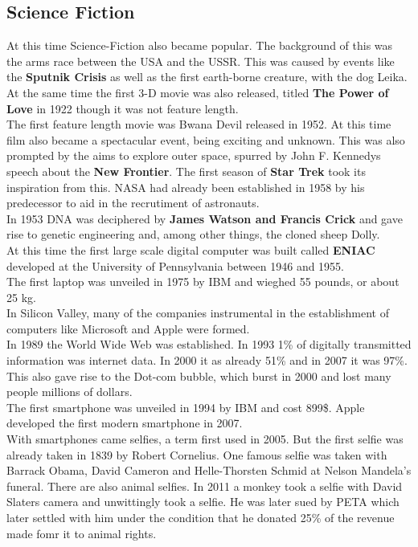 \documentclass{article}
\begin{document}
	\subsection{Science Fiction}
	At this time Science-Fiction also became popular. The background of this was the arms race between the USA and the USSR. This was caused by events like the \textbf{Sputnik Crisis} as well as the first earth-borne creature, with the dog Leika. \\
	At the same time the first 3-D movie was also released, titled \textbf{The Power of Love} in 1922 though it was not feature length. \\
	The first feature length movie was Bwana Devil released in 1952.
	At this time film also became a spectacular event, being exciting and unknown. This was also prompted by the aims to explore outer space, spurred by John F. Kennedys speech about the \textbf{New Frontier}. The first season of \textbf{Star Trek} took its inspiration from this. NASA had already been established in 1958 by his predecessor to aid in the recrutiment of astronauts. \\
	In 1953 DNA was deciphered by \textbf{James Watson and Francis Crick} and gave rise to genetic engineering and, among other things, the cloned sheep Dolly. \\
	At this time the first large scale digital computer was built called \textbf{ENIAC} developed at the University of Pennsylvania between 1946 and 1955. \\
	The first laptop was unveiled in 1975 by IBM and wieghed 55 pounds, or about 25 kg. \\
	In Silicon Valley, many of the companies instrumental in the establishment of computers like Microsoft and Apple were formed. \\
	In 1989 the World Wide Web was established. In 1993 1\% of digitally transmitted information was internet data. In 2000 it as already 51\% and in 2007 it was 97\%. This also gave rise to the Dot-com bubble, which burst in 2000 and lost many people millions of dollars. \\
	The first smartphone was unveiled in 1994 by IBM and cost 899\$. Apple developed the first modern smartphone in 2007. \\
	With smartphones came selfies, a term first used in 2005. But the first selfie was already taken in 1839 by Robert Cornelius. One  famous selfie was taken with Barrack Obama, David Cameron and Helle-Thorsten Schmid at Nelson Mandela's funeral. There are also animal selfies. In 2011 a monkey took a selfie with David Slaters camera and unwittingly took a selfie. He was later sued by PETA which later settled with him under the condition that he donated 25\% of the revenue made fomr it to animal rights. \\
	
\end{document}
